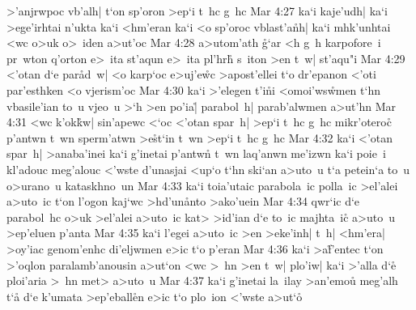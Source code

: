 >'anjrwpoc
vb'alh|
t`on
sp'oron
>ep`i
t~hc
g~hc\bibvsend
\vs Mar 4:27
ka`i
kaje'udh|
ka`i
>ege'irhtai
n'ukta
ka`i
<hm'eran
ka`i
<o
sp'oroc
vblast'a\r{n}h|
ka`i
mhk'unhtai
<wc
o>uk
o>~iden
a>ut'oc\bibvsend
\vs Mar 4:28
a>utom'ath
\r{g}`ar
<h
g~h
karpofore~i
pr~wton
q'orton
e>~ita
st'aqun
e>~ita
pl'hr\r{h}
s~iton
>en
t~w|
st'aqu"i\bibvsend
\vs Mar 4:29
<'otan
d`e
par\r{a}d~w|
<o
karp`oc
e>uj'e\r{w}c
>apost'ellei
t`o
dr'epanon
<'oti
par'esthken
<o
vjerism'oc\bibvsend
\vs Mar 4:30
ka`i
>'elegen
t'i\r{n}i
<omoi'ws\r{w}men
t`hn
vbasile'ian
to~u
vjeo~u
>`h
>en
po'ia|\r{}
parabol~h|
parab'alwmen
a>ut'hn\bibvsend
\vs Mar 4:31
<wc
k'ok\r{k}w|
sin'apewc
<`oc
<'otan
spar~h|
>ep`i
t~hc
g~hc
mikr'otero\r{c}
p'antwn
t~wn
sperm'atwn
>e\r{s}t`in
t~wn
>ep`i
t~hc
g~hc\bibvsend
\vs Mar 4:32
ka`i
<'otan
spar~h|
>anaba'inei
ka`i
g'inetai
p'antwn\r{}
t~wn
laq'anwn
me'izwn
ka`i
poie~i
kl'adouc
meg'alouc
<'wste
d'unasjai
<up`o
t`hn
ski`an
a>uto~u
t`a
petein`a
to~u
o>urano~u
kataskhno~un\bibvsend
\vs Mar 4:33
ka`i
toia'utaic
parabola~ic
polla~ic
>el'alei
a>uto~ic
t`on
l'ogon
kaj`wc
>hd'un\r{a}nto
>ako'uein\bibvsend
\vs Mar 4:34
qwr`ic
d`e
parabol~hc
o>uk
>el'alei
a>uto~ic
kat>
>id'ian
d`e
to~ic
majhta~ic\r{}
a>uto~u
>ep'eluen
p'anta\bibvsend
\vs Mar 4:35
ka`i
l'egei
a>uto~ic
>en
>eke'inh|
t~h|
<hm'era|
>oy'iac
genom'enhc
di'eljwmen
e>ic
t`o
p'eran\bibvsend
\vs Mar 4:36
ka`i
>a\r{f}'entec
t`on
>'oqlon
paralamb'anousin
a>ut`on
<wc
>~hn
>en
t~w|
plo'iw|
ka`i
>'alla
d`e\r{}
ploi'aria
>~hn
met>
a>uto~u\bibvsend
\vs Mar 4:37
ka`i
g'inetai
la~ilay
>an'emou\r{}
meg'alh
t`a\r{}
d`e
k'umata
>ep'eball\r{e}n
e>ic
t`o
plo~ion
<'wste
a>ut`o\r{}
